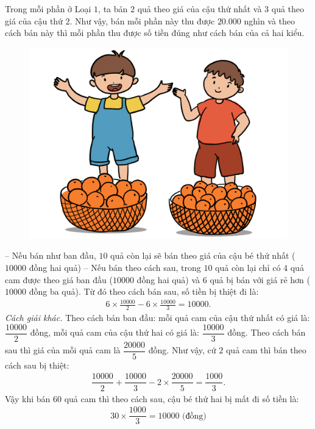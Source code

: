 \begin{multicols}{2}
	\vskip 0.1cm
	Trong mỗi phần ở Loại $1$, ta bán $2$ quả theo giá của cậu thứ nhất và $3$ quả theo giá của cậu thứ $2$. Như vậy, bán mỗi phần này  thu được $20{.}000$ nghìn và theo cách bán này thì mỗi phần thu được số tiền đúng như cách bán của cả hai kiểu.
	\begin{figure}[H]
		\centering
		\vspace*{-10pt}
		\captionsetup{labelformat= empty, justification=centering}
		\includegraphics[width=0.7\linewidth]{Pi10_ToanBi_Bai2}
		\vspace*{-10pt}
	\end{figure}
	-- Nếu bán như ban đầu, $10$ quả còn lại sẽ bán theo giá của cậu bé thứ nhất ($10000$ đồng hai quả)
	\vskip 0.1cm
	-- Nếu bán theo cách sau, trong $10$ quả còn lại chỉ có $4$ quả cam được theo giá ban đầu ($10000$ đồng hai quả) và $6$ quả bị bán với giá rẻ hơn ($10000$ đồng ba quả).
	\vskip 0.1cm
	Từ đó theo cách bán sau, số tiền bị thiệt đi là:
	\setlength{\abovedisplayskip}{5pt}
	\setlength{\belowdisplayskip}{5pt}
	\begin{align*}
		6\times\frac{10000}{2} - 6\times\frac{10000}{3} = 10000.
	\end{align*}
	\textit{Cách giải khác.}
	\vskip 0.1cm
	Theo cách bán ban đầu: mỗi quả cam của cậu thứ nhất có giá là: $\dfrac{10000}{2}$ đồng, mỗi quả cam của cậu thứ hai có giá là: $\dfrac{10000}{3}$ đồng.
	\vskip 0.1cm
	Theo cách bán sau thì giá của mỗi quả cam là $\dfrac{20000}{5}$ đồng.
	\vskip 0.1cm
	Như vậy, cứ $2$ quả cam thì bán theo cách sau bị thiệt:
	\begin{align*}
		\dfrac{10000}{2} + \dfrac{10000}{3} - 2\times\dfrac{20000}{5} = \dfrac{1000}{3}.
	\end{align*}
	Vậy khi bán $60$ quả cam thì theo cách sau, cậu bé thứ hai bị mất đi số tiền là:
	\begin{align*}
		30\times \dfrac{1000}{3} = 10000 \text{ (đồng)}

\end{align*}
\end{multicols}
